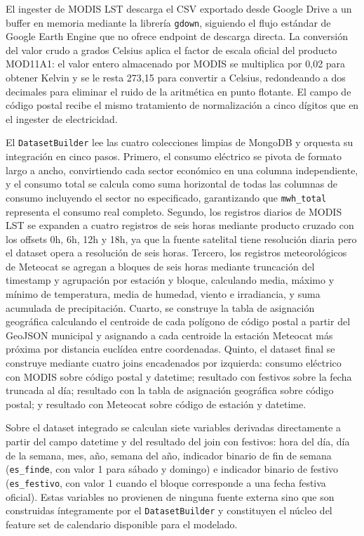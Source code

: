 \documentclass[12pt, a4paper]{article}
\begin{document}
El ingester de MODIS LST descarga el CSV exportado desde Google Drive a un buffer en memoria mediante la librería \texttt{gdown}, siguiendo el flujo estándar de Google Earth Engine que no ofrece endpoint de descarga directa. La conversión del valor crudo a grados Celsius aplica el factor de escala oficial del producto MOD11A1: el valor entero almacenado por MODIS se multiplica por 0,02 para obtener Kelvin y se le resta 273,15 para convertir a Celsius, redondeando a dos decimales para eliminar el ruido de la aritmética en punto flotante. El campo de código postal recibe el mismo tratamiento de normalización a cinco dígitos que en el ingester de electricidad.

El \texttt{DatasetBuilder} lee las cuatro colecciones limpias de MongoDB y orquesta su integración en cinco pasos. Primero, el consumo eléctrico se pivota de formato largo a ancho, convirtiendo cada sector económico en una columna independiente, y el consumo total se calcula como suma horizontal de todas las columnas de consumo incluyendo el sector no especificado, garantizando que \texttt{mwh\_total} representa el consumo real completo. Segundo, los registros diarios de MODIS LST se expanden a cuatro registros de seis horas mediante producto cruzado con los offsets 0h, 6h, 12h y 18h, ya que la fuente satelital tiene resolución diaria pero el dataset opera a resolución de seis horas. Tercero, los registros meteorológicos de Meteocat se agregan a bloques de seis horas mediante truncación del timestamp y agrupación por estación y bloque, calculando media, máximo y mínimo de temperatura, media de humedad, viento e irradiancia, y suma acumulada de precipitación. Cuarto, se construye la tabla de asignación geográfica calculando el centroide de cada polígono de código postal a partir del GeoJSON municipal y asignando a cada centroide la estación Meteocat más próxima por distancia euclídea entre coordenadas. Quinto, el dataset final se construye mediante cuatro joins encadenados por izquierda: consumo eléctrico con MODIS sobre código postal y datetime; resultado con festivos sobre la fecha truncada al día; resultado con la tabla de asignación geográfica sobre código postal; y resultado con Meteocat sobre código de estación y datetime.

Sobre el dataset integrado se calculan siete variables derivadas directamente a partir del campo datetime y del resultado del join con festivos: hora del día, día de la semana, mes, año, semana del año, indicador binario de fin de semana (\texttt{es\_finde}, con valor 1 para sábado y domingo) e indicador binario de festivo (\texttt{es\_festivo}, con valor 1 cuando el bloque corresponde a una fecha festiva oficial). Estas variables no provienen de ninguna fuente externa sino que son construidas íntegramente por el \texttt{DatasetBuilder} y constituyen el núcleo del feature set de calendario disponible para el modelado.
\end{document}
